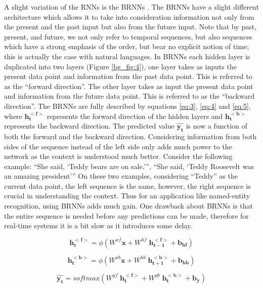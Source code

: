 A slight variation of the \ac{RNN}s is the \ac{BRNN}s \cite{schuster1997bidirectional}. The \ac{BRNN}s have a slight different architecture which allows it to take into consideration information not only from the present and the past input but also from the future input. Note that by past, present, and future, we not only refer to temporal sequences, but also sequences which have a strong emphasis of the order, but bear no explicit notion of time; this is actually the case with natural languages. In \ac{BRNN}s each hidden layer is duplicated into two layers (Figure \ref{bg_fig:4}), one layer takes as inputs the present data point and information from the past data point. This is referred to as the \enquote{forward direction}. The other layer takes as input the present data point and information from the future data point. This is referred to as the \enquote{backward direction}. The \ac{BRNN}s are fully described by equations \ref{eq:3}, \ref{eq:4} and \ref{eq:5}, where $ \mathbf{h_t^{<f>}} $ represents the forward direction of the hidden layers and $ \mathbf{h_t^{<b>}} $ represents the backward direction. The predicted value $ \mathbf{\widehat{y_t}} $ is now a function of both the forward and the backward direction. Considering information from both sides of the sequence instead of the left side only adds much power to the network as the context is understood much better. Consider the following example: \enquote{She said, \enquote{Teddy bears are on sale.}}, \enquote{She said, \enquote{Teddy Roosevelt was an amazing president}} On these two examples, considering \enquote{Teddy} as the current data point, the left sequence is the same, however, the right sequence is crucial in understanding the context. Thus for an application like named-entity recognition, using \ac{BRNN}s adds much gain. One drawback about \ac{BRNN}s is that the entire sequence is needed before any predictions can be made, therefore for real-time systems it is a bit slow as it introduces some delay.

\begin{equation}
\label{eq:3}
\mathbf{h_t^{<f>}} = \phi(W^{xf} \mathbf{x} + W^{hf} \; \mathbf{h_{t-1}^{<f>}} + \mathbf{b_{hf}})
\end{equation}

\begin{equation}
\label{eq:4}
\mathbf{h_t^{<b>}} = \phi(W^{xb} \mathbf{x} + W^{hb} \; \mathbf{h_{t+1}^{<b>}} + \mathbf{b_{hb}})
\end{equation}

\begin{equation}
\label{eq:5}
\mathbf{\widehat{y_t}} = softmax(W^{yf} \; \mathbf{h_t^{<f>}} + W^{yb} \; \mathbf{h_t^{<b>}} + \mathbf{b_y})
\end{equation}


